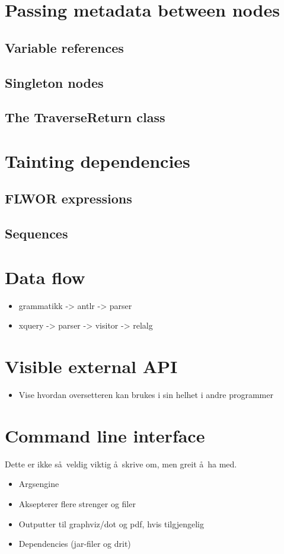\section{Passing metadata between nodes}
\subsection{Variable references}
\subsection{Singleton nodes}
\subsection{The TraverseReturn class}

\section{Tainting dependencies}
\subsection{FLWOR expressions}
\subsection{Sequences}

\section{Data flow}
\begin{itemize}
  \item grammatikk -> antlr -> parser
  \item xquery -> parser -> visitor -> relalg
\end{itemize}

\section{Visible external API}
\begin{itemize}
  \item Vise hvordan oversetteren kan brukes i sin helhet i andre programmer
\end{itemize}

\section{Command line interface}
Dette er ikke s\aa~veldig viktig \aa~skrive om, men greit \aa~ha med.
\begin{itemize}
  \item Argsengine
  \item Aksepterer flere strenger og filer
  \item Outputter til graphviz/dot og pdf, hvis tilgjengelig
  \item Dependencies (jar-filer og drit)
\end{itemize}

